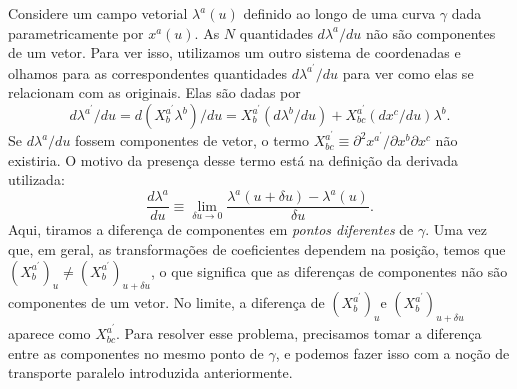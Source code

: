 Considere um campo vetorial $ \lambda^a(u) $ definido ao longo de uma curva $ \gamma $ dada parametricamente por $ x^a(u) $. As $ N $ quantidades $ d \lambda^{a} / d u $ não são componentes de um vetor. Para ver isso, utilizamos um outro sistema de coordenadas e olhamos para as correspondentes quantidades $ d \lambda^{a^{\prime}} / d u $ para ver como elas se relacionam com as originais. Elas são dadas por
\begin{equation}\label{eq:TransformacaoCoordenadasDerivadaCurva}
d \lambda^{a^{\prime}} / d u=d\left(X_{b}^{a^{\prime}} \lambda^{b}\right) / d u=X_{b}^{a^{\prime}}\left(d \lambda^{b} / d u\right)+X_{b c}^{a^{\prime}}\left(d x^{c} / d u\right) \lambda^{b} .
\end{equation}
Se $ d \lambda^{a} / d u $ fossem componentes de vetor, o termo $ X_{b c}^{a^{\prime}} \equiv \partial^{2} x^{a^{\prime}} / \partial x^{b} \partial x^{c} $ não existiria. O motivo da presença desse termo está na definição da derivada utilizada:
\begin{equation}\label{eq:DerivadaTotalLambda}
\frac{d \lambda^{a}}{d u} \equiv \lim _{\delta u \rightarrow 0} \frac{\lambda^{a}(u+\delta u)-\lambda^{a}(u)}{\delta u} .
\end{equation}
Aqui, tiramos a diferença de componentes em \textit{pontos diferentes} de $ \gamma $. Uma vez que, em geral, as transformações de coeficientes dependem na posição, temos que $ \left(X_{b}^{a^{\prime}}\right)_{u} \neq\left(X_{b}^{a^{\prime}}\right)_{u+\delta u} $, o que significa que as diferenças de componentes não são componentes de um vetor. No limite, a diferença de $ \left(X_{b}^{a^{\prime}}\right)_{u} \text{e } \left(X_{b}^{a^{\prime}}\right)_{u+\delta u} $ aparece como $ X_{b c}^{a^{\prime}} $. Para resolver esse problema, precisamos tomar a diferença entre as componentes no mesmo ponto de $ \gamma $, e podemos fazer isso com a noção de transporte paralelo introduzida anteriormente.

